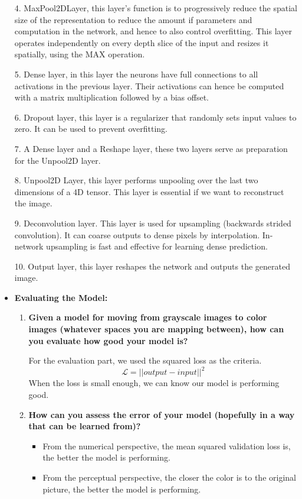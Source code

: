 \documentclass[letter]{article}
\begin{document}
\begin{itemize}
{	}\par{4.	MaxPool2DLayer, this layer’s function is to progressively reduce the spatial size of the representation to reduce the amount if parameters and computation in the network, and hence to also control overfitting. This layer operates independently on every depth slice of the input and resizes it spatially, using the MAX operation.
	}\par{5.	Dense layer, in this layer the neurons have full connections to all activations in the previous layer. Their activations can hence be computed with a matrix multiplication followed by a bias offset.
	}\par{6.	Dropout layer, this layer is a regularizer that randomly sets input values to zero. It can be used to prevent overfitting.
	}\par{7.	A Dense layer and a Reshape layer, these two layers serve as preparation for the Unpool2D layer.
	}\par{8.	Unpool2D Layer, this layer performs unpooling over the last two dimensions of a 4D tensor. This layer is essential if we want to reconstruct the image.
	}\par{9.	Deconvolution layer. This layer is used for upsampling (backwards strided convolution). It can coarse outputs to dense pixels by interpolation. In-network upsampling is fast and effective for learning dense prediction.
	}\par{10.	Output layer, this layer reshapes the network and outputs the generated image.
	}
	\item {\textbf{Evaluating the Model:}} 
	\begin{enumerate}
		\item {\textbf{Given a model for moving from grayscale images to color images (whatever spaces you are mapping between), how can you evaluate how good your model is?}}
		\par{For the evaluation part, we used the squared loss as the criteria. \[ \mathcal{L} = || output - input ||^2 \] When the loss is small enough, we can know our model is performing good.}
		\item {\textbf{How can you assess the error of your model (hopefully in a way that can be learned from)? }}
		\begin{itemize}
			\item {From the numerical perspective, the mean squared validation loss is, the better the model is performing. }
			\item {From the perceptual perspective, the closer the color is to the original picture, the better the model is performing.}

\end{itemize}
\end{enumerate}
\end{itemize}
\end{document}
